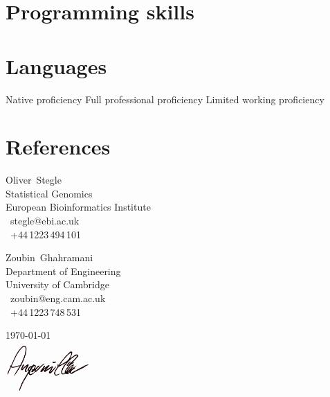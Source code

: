 \documentclass[11pt,a4paper]{moderncv}
\begin{document}
\clearpage
\newpage

\section{Programming skills}

\section{Languages}
        {Native proficiency}
        {Full professional proficiency}
        {Limited working proficiency}

\section{References}
\hspace*{\hintscolumnwidth}%
\hspace*{-0.8cm}%
\begin{minipage}[t]{.5\linewidth}
Oliver~Stegle\\
Statistical Genomics\\
European Bioinformatics Institute\\
\emailsymbol\ stegle@ebi.ac.uk\\
\phonesymbol\ +44\,1223\,494\,101\\
\end{minipage}
\hfill
\begin{minipage}[t]{.5\linewidth}
Zoubin~Ghahramani\\
Department of Engineering\\
University of Cambridge\\
\emailsymbol\ zoubin@eng.cam.ac.uk\\
\phonesymbol\ +44\,1223\,748\,531\\
\end{minipage}
\hfill

\vspace{3cm}
\parbox{5cm}{\today\\[2ex]
\hspace*{2mm}\includegraphics[width=3.25cm]{signature_bw.jpg}}
\end{document}
